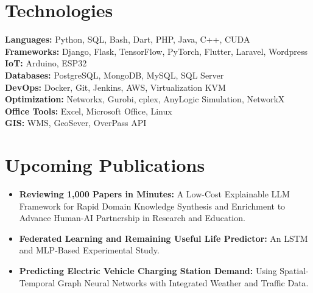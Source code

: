 \documentclass[10pt, letterpaper]{article}
\begin{document}
\section*{Technologies}
\small
\begin{multicols}{2}
    \textbf{Languages:} Python, SQL, Bash, Dart, PHP, Java, C++, CUDA \\
    \textbf{Frameworks:} Django, Flask, TensorFlow, PyTorch, Flutter, Laravel, Wordpress \\
    \textbf{IoT:} Arduino, ESP32 \\
    \textbf{Databases:} PostgreSQL, MongoDB, MySQL, SQL Server \\
    \textbf{DevOps:} Docker, Git, Jenkins, AWS, Virtualization KVM \\
    \textbf{Optimization:} Networkx, Gurobi, cplex, AnyLogic Simulation, NetworkX \\
    \textbf{Office Tools:} Excel, Microsoft Office, Linux \\
    \textbf{GIS:} WMS, GeoSever, OverPass API \\
\end{multicols}



\section*{Upcoming Publications}
\small
\begin{itemize}[left=0pt]
    \item \textbf{Reviewing 1,000 Papers in Minutes:} A Low-Cost Explainable LLM Framework for Rapid Domain Knowledge Synthesis and Enrichment to Advance Human-AI Partnership in Research and Education.
    \item \textbf{Federated Learning and Remaining Useful Life Predictor:} An LSTM and MLP-Based Experimental Study.
    \item \textbf{Predicting Electric Vehicle Charging Station Demand:} Using Spatial-Temporal Graph Neural Networks with Integrated Weather and Traffic Data.
\end{itemize}




 


    
\end{document}
